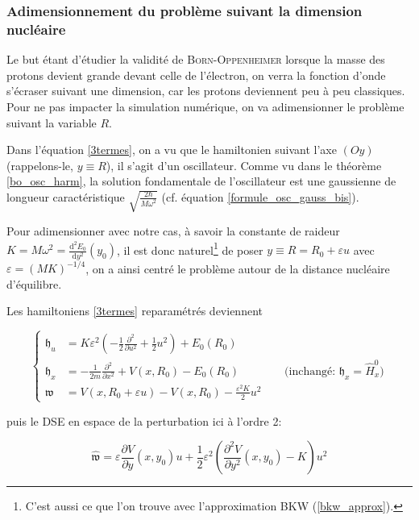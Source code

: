 \documentclass[svgnames,dvipsnames,a4paper,10pt,french]{report}
\begin{document}
\subsubsection{Adimensionnement du problème suivant la dimension nucléaire}
Le but étant d'étudier la validité de \textsc{Born-Oppenheimer} lorsque la masse des protons devient grande devant celle de l'électron, on verra la fonction d'onde s'écraser suivant une dimension, car les protons deviennent peu à peu classiques. Pour ne pas impacter la simulation numérique, on va adimensionner le problème suivant la variable $R$.

Dans l'équation \ref{3termes}, on a vu que le hamiltonien suivant l'axe $(Oy)$ (rappelons-le, $y \equiv R$), il s'agit d'un oscillateur. Comme vu dans le théorème \ref{bo_osc_harm}, la solution fondamentale de l'oscillateur est une gaussienne de longueur caractéristique $\sqrt{\frac{2\hbar}{M\omega^2}}$ (cf. équation \ref{formule_osc_gauss_bis}).

Pour adimensionner avec notre cas, à savoir la constante de raideur $K =M\omega^2=\frac{\mathrm{d}^2 E_0}{\mathrm{d}y^2}(y_0)$,  il est donc naturel\footnote{C'est aussi ce que l'on trouve avec l'approximation BKW (\ref{bkw_approx}).} de poser $y \equiv R = R_0 + \varepsilon u$ avec $\varepsilon = (MK)^{-1/4}$, on a ainsi centré le problème autour de la distance nucléaire d'équilibre.

Les hamiltoniens \ref{3termes} reparamétrés deviennent



\begin{equation}
\label{3termes_bis}
       \left\{  \begin{array}{ll}
        \mathfrak{h}_u &= K\varepsilon^2  \left( -\frac{1}{2} \frac{\partial^2}{\partial u^2} + \frac{1}{2}u^2\right)  + E_0(R_0) \\
        \mathfrak{h}_x &= - \frac{1}{2m} \frac{\partial^2}{\partial x^2} + V(x,R_0) -E_0(R_0) \qquad \qquad \text{(inchangé: $\mathfrak{h}_x=\hat{H}^0_x$)}\\
        \mathfrak{w} &=   V(x,R_0 + \varepsilon u) - V(x,R_0) - \frac{\varepsilon^2 K}{2} u^2    \end{array}\right.
\end{equation}

puis le DSE en espace de la perturbation ici à l'ordre 2:

\begin{equation}
\label{W_pert_tronque_bis}
     \hat{\mathfrak{w}} = \varepsilon \frac{\partial V}{\partial y}(x,y_0)u  + \frac{1}{2} \varepsilon^2 \left(\frac{\partial^2V}{\partial y^2}(x,y_0) -K \right)   u^2
\end{equation}
\end{document}
